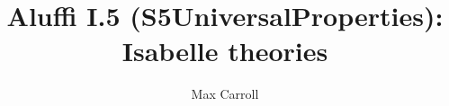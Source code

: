 \documentclass[11pt,a4paper]{article}
\begin{document}
\title{Aluffi I.5 (S5UniversalProperties): Isabelle theories}
\author{Max Carroll}
\maketitle


\end{document}
